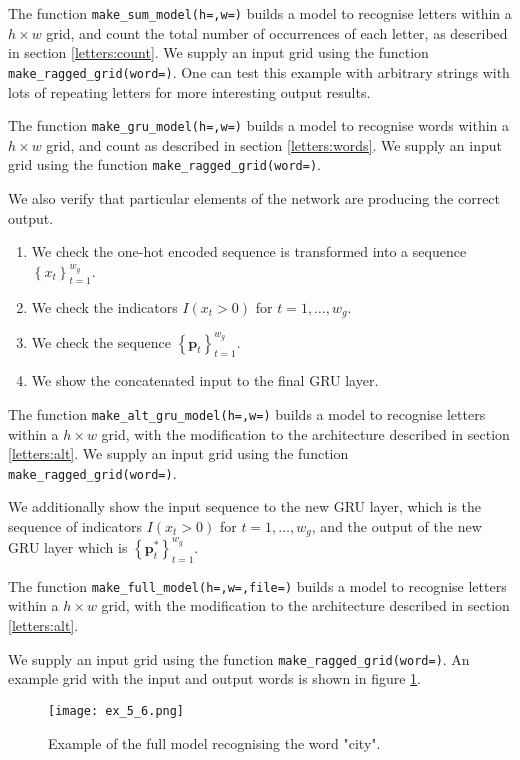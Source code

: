 \documentclass{somasmsc}
\begin{document}
\begin{exa}
The function \verb|make_sum_model(h=,w=)| builds a model to recognise letters within a $h \times w$ grid, and count the total number of occurrences of each letter, as described in section \ref{letters:count}. We supply an input grid using the function \verb|make_ragged_grid(word=)|. One can test this example with arbitrary strings with lots of repeating letters for more interesting output results.
\end{exa}

\begin{exa}
The function \verb|make_gru_model(h=,w=)| builds a model to recognise words within a $h \times w$ grid, and count as described in section \ref{letters:words}. We supply an input grid using the function \verb|make_ragged_grid(word=)|.

We also verify that particular elements of the network are producing the correct output.
\begin{enumerate}
    \item We check the one-hot encoded sequence is transformed into a sequence $\left\{x_t\right\}_{t=1}^{w_g}$.
    \item We check the indicators $I\left(x_t > 0\right)$ for $t=1, \dots, w_g$.
    \item We check the sequence $\left\{\pmb{p}_t\right\}_{t=1}^{w_g}$.
    \item We show the concatenated input to the final GRU layer.
\end{enumerate}
\end{exa}

\begin{exa}
The function \verb|make_alt_gru_model(h=,w=)| builds a model to recognise letters within a $h \times w$ grid, with the modification to the architecture described in section \ref{letters:alt}. We supply an input grid using the function \verb|make_ragged_grid(word=)|.

We additionally show the input sequence to the new GRU layer, which is the sequence of indicators $I\left(x_t > 0\right)$ for $t=1, \dots, w_g$, and the output of the new GRU layer which is $\left\{\pmb{p}^*_t\right\}_{t=1}^{w_g}$.
\end{exa}

\begin{exa}
The function \verb|make_full_model(h=,w=,file=)| builds a model to recognise letters within a $h \times w$ grid, with the modification to the architecture described in section \ref{letters:alt}. 

We supply an input grid using the function \verb|make_ragged_grid(word=)|. An example grid with the input and output words is shown in figure \ref{letters:ex_5_6}.

\begin{figure}[H]\label{letters:ex_5_6}
\begin{center}
\texttt{[image: ex\_5\_6.png]}
\end{center}
\caption{Example of the full model recognising the word "city".}
\end{figure}
\end{exa}
\end{document}

